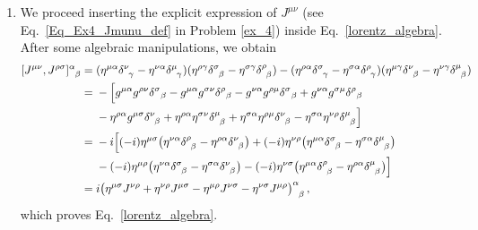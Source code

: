 \begin{sol}
    \begin{enumerate}[label=\alph*)]
        \item We proceed inserting the explicit expression of $J^{\mu \nu}$ (see Eq.~\eqref{Eq_Ex4_Jmunu_def} in Problem \ref{ex_4}) inside Eq.~\eqref{lorentz_algebra}. After some algebraic manipulations, we obtain
        \begin{align}
            \tensor{[J^{\mu\nu}, J^{\rho \sigma}]}{^\alpha_\beta} ={}& (\g^{\mu\alpha}\tensor{\delta}{^\nu_\gamma} - \g^{\nu\alpha}\tensor{\delta}{^\mu_\gamma})(\g^{\rho\gamma}\tensor{\delta}{^\sigma_\beta} - \g^{\sigma\gamma}\tensor{\delta}{^\rho_\beta}) - (\g^{\rho\alpha}\tensor{\delta}{^\sigma_\gamma} - \g^{\sigma\alpha}\tensor{\delta}{^\rho_\gamma})(\g^{\mu\gamma}\tensor{\delta}{^\nu_\beta} - \g^{\nu\gamma}\tensor{\delta}{^\mu_\beta}) \notag \\
            ={}& - \Bigl[ g^{\mu \alpha} g^{\rho \nu} \delta^\sigma{}_\beta - g^{\mu \alpha} g^{\sigma \nu} \delta^\rho{}_\beta -g^{\nu \alpha} g^{\rho \mu} \delta^\sigma{}_\beta + g^{\nu \alpha} g^{\sigma \mu} \delta^\rho{}_\beta \notag \\
            & - \g^{\rho \alpha} g^{\mu \sigma} \tensor{\delta}{^\nu_\beta} + \g^{\rho \alpha} \g^{\sigma \nu} \tensor{\delta}{^\mu_\beta} + \g^{\sigma \alpha} \g^{\rho \mu} \tensor{\delta}{^\nu_\beta} - \g^{\sigma \alpha} \g^{\nu \rho} \tensor{\delta}{^\mu_\beta} \Bigr] \notag \\
            ={}& -i \Bigl[ (-i)\g^{\mu \sigma}\bigl(\g^{\nu \alpha} \tensor{\delta}{^\rho_\beta} - \g^{\rho \alpha} \tensor{\delta}{^\nu_\beta} \bigr) + (-i) \g^{\nu \rho}\bigl(\g^{\mu \alpha} \tensor{\delta}{^\sigma_\beta} - \g^{\sigma \alpha} \tensor{\delta}{^\mu_\beta} \bigr) \notag \\
            & - (-i) \g^{\mu \rho}\bigl(\g^{\nu \alpha} \tensor{\delta}{^\sigma_\beta} - \g^{\sigma \alpha} \tensor{\delta}{^\nu_\beta} \bigr) - (-i)\g^{\nu \sigma}\bigl(\g^{\mu \alpha} \tensor{\delta}{^\rho_\beta} - \g^{\rho \alpha} \tensor{\delta}{^\mu_\beta} \bigr)\Bigr] \notag \\
            ={}& i \tensor{\big( \g^{\mu \sigma} J^{\nu \rho} + \g^{\nu \rho} J^{\mu \sigma} - \g^{\mu \rho} J^{\nu \sigma} - \g^{\nu \sigma} J^{\mu \rho} \big)}{^\alpha_\beta} \, ,
        \end{align}
        which proves Eq.~\eqref{lorentz_algebra}. \\


\end{enumerate}
\end{sol}
